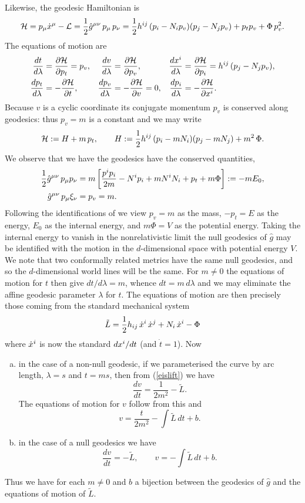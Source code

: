 \documentclass{article}
\begin{document}
Likewise, the geodesic Hamiltonian is
$$\mathcal{H}=p_\mu \dot x\sp{\mu}-\mathcal{L} = \frac12 \hat{g}\sp{\mu\nu}\,p_{\mu}\, p_{\nu}=
\frac12 h\sp{ij}\, (p_{i}-N_i p_v)(p_j-N_j p_v) +p_t  p_v+\Phi \,p_v^2 .
$$
The equations of motion are
\begin{align*}
\frac{dt}{d\lambda}&=\frac{\partial \mathcal{H}}{\partial p_t}=p_v, &
\frac{dv}{d\lambda}&=\frac{\partial \mathcal{H}}{\partial p_v},& 
\frac{d x^i}{d\lambda}&=\frac{\partial \mathcal{H}}{\partial p_i}=h\sp{ij}\, (p_j-N_j p_v),
\\
\frac{d p_t}{d\lambda}&=-\frac{\partial \mathcal{H}}{\partial t},
&
\frac{d p_v}{d\lambda}&=-\frac{\partial \mathcal{H}}{\partial v}=0,&
\frac{d p_i}{d\lambda}&=-\frac{\partial \mathcal{H}}{\partial x^i}.
\end{align*}
Because $v$ is a cyclic coordinate its conjugate momentum $p_v$ is conserved along geodesics:
thus $p_v=m$ is a constant and we may write
$$\mathcal{H}:=H+m\, p_t,\qquad H:=\frac12 h\sp{ij}\, (p_{i}-m N_i )(p_j-m N_j) +m^2\, \Phi.$$
We observe that we have the geodesics have the conserved quantities,
\begin{align*}
\frac12 \hat g\sp{\mu\nu}\, p_\mu p_\nu&=m\left[ \frac{p\sp{i}p_i}{2m}- N\sp{i}p_i +m N\sp{i}N_i
+p_t +m\Phi \right] :=- m E_0,\\
\hat g\sp{\mu\nu}\, p_\mu \xi_\nu&=p_v=m.
\end{align*}
Following the identifications of \cite{Duval1991} we view $p_v=m$ as the mass, $-p_t=E$  as the energy,
$E_0$ as the internal energy, and $m\Phi=V$ as the potential energy. Taking the internal energy to vanish in the nonrelativistic limit the null geodesics of $\hat g$ may be identified with the motion in the $d$-dimensional space with potential energy $V$. We note that two conformally related metrics have the same null geodesics, and so the $d$-dimensional world lines will be the same. For $m\ne 0$ the equations of motion for $t$ then give $dt/d\lambda=m$, whence $dt =m\,d\lambda$ and we may eliminate the affine geodesic parameter $\lambda$
for $t$. The equations of motion are then precisely those coming from the standard mechanical system
$$\tilde L= \frac12 h_{ij}\, \dot x\sp{i}\, \dot x\sp{j}+N_i \,\dot x\sp{i}-\Phi $$
where $ \dot x\sp{i}$ is now the standard $d x\sp{i}/dt$ (and $\dot t = 1$). Now
\begin{enumerate}[(a)]
\item in the case of a non-null geodesic, if we parameterised the curve by arc length, $\lambda=s$ and $t =ms$, then from (\ref{eislift}) we have 
$$\frac{dv}{dt}= \frac1{2m^2} -\tilde L.$$
The equations of motion for $v$ follow from this and
$$v=\frac{t}{2m^2}-\int \tilde L\, dt +b.$$
\item in the case of a null geodesics we have
 $$\frac{dv}{dt}=  -\tilde L,\qquad  v=-\int \tilde L\, dt +b.$$
\end{enumerate}
Thus we have for each $m\ne0$ and $b$ a bijection between the geodesics of $\hat g$ and the
equations of motion of $\tilde L$.
\end{document}
